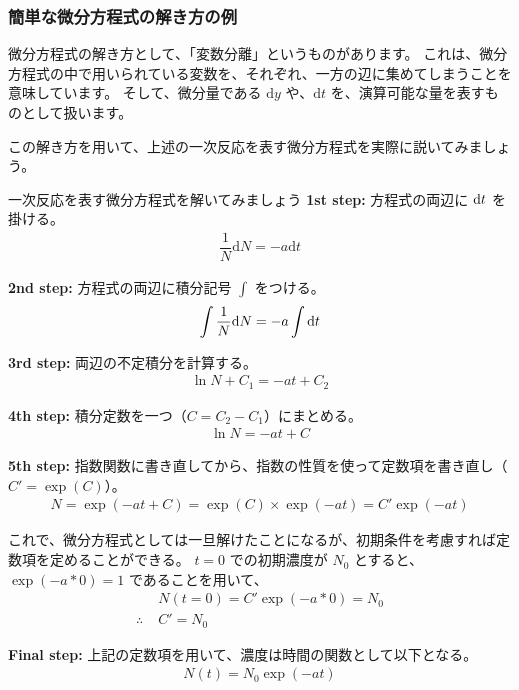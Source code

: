\documentclass[uplatex,dvipdfmx,a4paper,11pt]{jsarticle}
\begin{document}
\subsubsection{簡単な微分方程式の解き方の例}
微分方程式の解き方として、「変数分離」というものがあります。
これは、微分方程式の中で用いられている変数を、それぞれ、一方の辺に集めてしまうことを意味しています。
そして、微分量である $\mathrm{d}y$ や、$\mathrm{d}t$ を、演算可能な量を表すものとして扱います。

この解き方を用いて、上述の一次反応を表す微分方程式を実際に説いてみましょう。
\large
	\begin{itembox}[l]{一次反応を表す微分方程式を解いてみましょう}
		\textbf{1st step: }方程式の両辺に $\mathrm{d} t$ を掛ける。
		\begin{align*}
			\dfrac{1}{N} \mathrm{d}N= -a\mathrm{d} t
		\end{align*}

		\textbf{2nd step: }方程式の両辺に積分記号 $\int$ をつける。
		\begin{align*}
			\int \dfrac{1}{N} \mathrm{d} N = -a \int \mathrm{d} t
		\end{align*}

		\textbf{3rd step: }両辺の不定積分を計算する。
		\begin{align*}
			\ln N +C_1 = -at + C_2
		\end{align*}

		\textbf{4th step: }積分定数を一つ（$C=C_2-C_1$）にまとめる。
		\begin{align*}
			\ln N = -at + C
		\end{align*}

		\textbf{5th step: }指数関数に書き直してから、指数の性質を使って定数項を書き直し（$C'=\exp(C)$）。
		\begin{align*}
			N=\exp(-at + C) = \exp(C) \times \exp(-at) = C' \exp(-at)
		\end{align*}

		これで、微分方程式としては一旦解けたことになるが、初期条件を考慮すれば定数項を定めることができる。
		$t=0$ での初期濃度が $N_0$ とすると、$\exp(-a*0) = 1$ であることを用いて、
		\begin{align*}
			&N(t=0) = C' \exp(-a*0) = N_0 \\
			\therefore\; &C' = N_0
		\end{align*}

		\textbf{Final step: }上記の定数項を用いて、濃度は時間の関数として以下となる。
		\begin{align*}
			N(t) = N_0 \exp(-at)
		\end{align*}
	\end{itembox}
\normalsize
\end{document}
